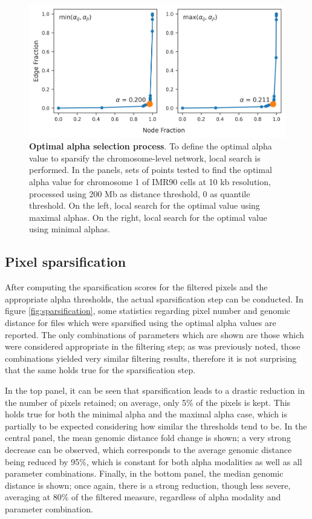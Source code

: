 \begin{figure}[h]
  \centering 
  \includegraphics[width=1\textwidth]{alpha_tables.png}
  \caption{\textbf{Optimal alpha selection process}. To define the optimal alpha value to sparsify the chromosome-level network, local search is performed. In the panels, sets of points tested to find the optimal alpha value for chromosome 1 of IMR90 cells at 10 kb resolution, processed using 200 Mb as distance threshold, 0 as quantile threshold. On the left, local search for the optimal value using maximal alphas. On the right, local search for the optimal value using minimal alphas.}
  \label{fig:alphas}
\end{figure}

\subsection{Pixel sparsification}

After computing the sparsification scores for the filtered pixels and the appropriate alpha thresholds, the actual sparsification step can be conducted. In figure \ref{fig:sparsification}, some statistics regarding pixel number and genomic distance for files which were sparsified using the optimal alpha values are reported. The only combinations of parameters which are shown are those which were considered appropriate in the filtering step; as was previously noted, those combinations yielded very similar filtering results, therefore it is not surprising that the same holds true for the sparsification step.

In the top panel, it can be seen that sparsification leads to a drastic reduction in the number of pixels retained; on average, only 5\% of the pixels is kept. This holds true for both the minimal alpha and the maximal alpha case, which is partially to be expected considering how similar the thresholds tend to be. In the central panel, the mean genomic distance fold change is shown; a very strong decrease can be observed, which corresponds to the average genomic distance being reduced by 95\%, which is constant for both alpha modalities as well as all parameter combinations. Finally, in the bottom panel, the median genomic distance is shown; once again, there is a strong reduction, though less severe, averaging at 80\% of the filtered measure, regardless of alpha modality and parameter combination.

